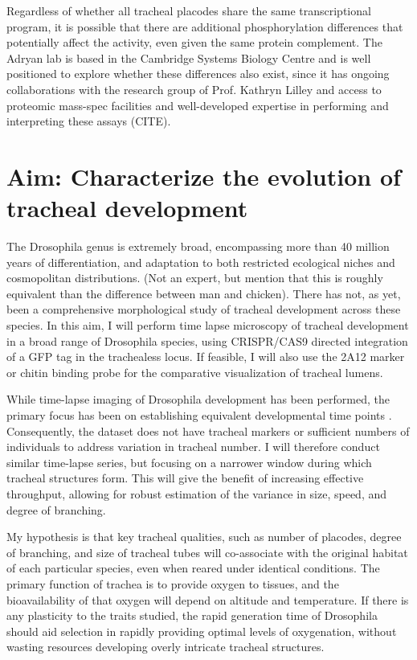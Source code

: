 \documentclass{proposal}
\begin{document}
Regardless of whether all tracheal placodes share the same transcriptional program, it is possible that there are additional phosphorylation differences that potentially affect the activity, even given the same protein complement.
The Adryan lab is based in the Cambridge Systems Biology Centre and is well positioned to explore whether these differences also exist, since it has ongoing collaborations with the research group of Prof.  Kathryn Lilley and access to proteomic mass-spec facilities and well-developed expertise in performing and interpreting these assays (CITE).


\section{Aim: Characterize the evolution of tracheal development}

The Drosophila genus is extremely broad, encompassing more than 40 million years of differentiation, and adaptation to both restricted ecological niches and cosmopolitan distributions.
(Not an expert, but mention that this is roughly equivalent than the difference between man and chicken).
There has not, as yet, been a comprehensive morphological study of tracheal development across these species.
In this aim, I will perform time lapse microscopy of tracheal development in a broad range of Drosophila species, using CRISPR/CAS9 directed integration of a GFP tag in the trachealess locus.
If feasible, I will also use the 2A12 marker or chitin binding probe for the comparative visualization of tracheal lumens.

While time-lapse imaging of Drosophila development has been performed, the primary focus has been on establishing equivalent developmental time points \cite{Kuntz:2014bc}.
Consequently, the dataset does not have tracheal markers or sufficient numbers of individuals to address variation in tracheal number.
I will therefore conduct similar time-lapse series, but focusing on a narrower window during which tracheal structures form.
This will give the benefit of increasing effective throughput, allowing for robust estimation of the variance in size, speed, and degree of branching.

My hypothesis is that key tracheal qualities, such as number of placodes, degree of branching, and size of tracheal tubes will co-associate with the original habitat of each particular species, even when reared under identical conditions.
The primary function of trachea is to provide oxygen to tissues, and the bioavailability of that oxygen will depend on altitude and temperature.
If there is any plasticity to the traits studied, the rapid generation time of Drosophila should aid selection in rapidly providing optimal levels of oxygenation, without wasting resources developing overly intricate tracheal structures.
\end{document}
